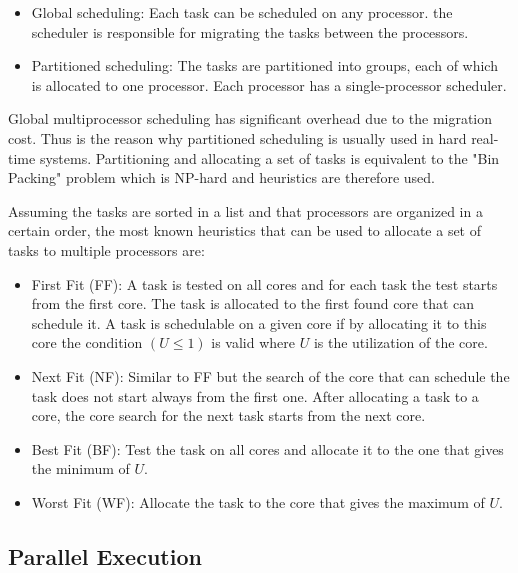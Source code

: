 \begin{itemize}
\item Global scheduling: Each task can be scheduled on any processor. the scheduler is responsible for migrating the tasks between the processors.
\item Partitioned scheduling: The tasks are partitioned into groups, each of which is allocated to one processor. Each processor has a single-processor scheduler. 
\end{itemize}
Global multiprocessor scheduling has significant overhead due to the migration cost. Thus is the reason why partitioned scheduling is usually used in hard real-time systems. Partitioning and allocating a set of tasks is equivalent to the "Bin Packing" problem which is NP-hard and heuristics are therefore used. 

Assuming the tasks are sorted in a list and that processors are organized in a certain order, the most known heuristics that can be used to allocate a set of tasks to multiple processors are:

\begin{itemize}
\item First Fit (FF): A task is tested on all cores and for each task the test starts from the first core. The task is allocated to the first found core that can schedule it. A task is schedulable on a given core if by allocating it to this core the condition $(U\leq1)$ is valid where $U$ is the utilization of the core.
\item Next Fit (NF): Similar to FF but the search of the core that can schedule the task does not start always from the first one. After allocating a task to a core, the core search for the next task starts from the next core.
\item Best Fit (BF): Test the task on all cores and allocate it to the one that gives the minimum of $U$.
\item Worst Fit (WF): Allocate the task to the core that gives the maximum of $U$.
\end{itemize}
  
\subsection{Parallel Execution}

